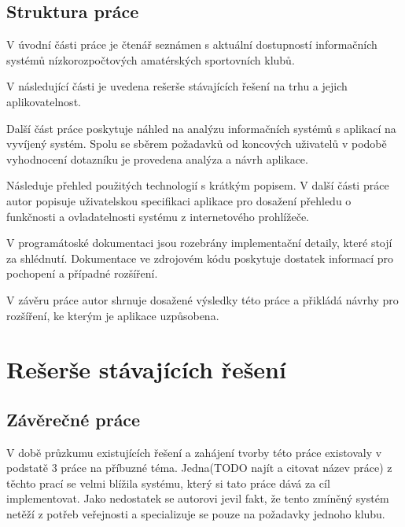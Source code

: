 \documentclass[11pt,oneside]{fithesis}
\begin{document}
        \section{Struktura práce}

        V úvodní části práce je čtenář seznámen s aktuální dostupností informačních systémů nízkorozpočtových amatérských sportovních klubů. 

        V následující části je uvedena rešerše stávajících řešení na trhu a jejich aplikovatelnost. 

        Další část práce poskytuje náhled na analýzu informačních systémů s aplikací na vyvíjený systém. Spolu se sběrem požadavků od koncových uživatelů v podobě vyhodnocení dotazníku je provedena analýza a návrh aplikace.

        Následuje přehled použitých technologií s krátkým popisem. V další části práce autor popisuje uživatelskou specifikaci aplikace pro dosažení přehledu o funkčnosti a ovladatelnosti systému z internetového prohlížeče.

        V programátoské dokumentaci jsou rozebrány implementační detaily, které stojí za shlédnutí. Dokumentace ve zdrojovém kódu poskytuje dostatek informací pro pochopení a případné rozšíření.

        V závěru práce autor shrnuje dosažené výsledky této práce a přikládá návrhy pro rozšíření, ke kterým je aplikace uzpůsobena.















\chapter{Rešerše stávajících řešení}
\section{Závěrečné práce}

V době průzkumu existujících řešení a zahájení tvorby této práce existovaly v podstatě 3 práce na příbuzné téma. Jedna(TODO najít a citovat název práce) z těchto prací se velmi blížila systému, který si tato práce dává za cíl implementovat. Jako nedostatek se autorovi jevil fakt, že tento zmíněný systém netěží z potřeb veřejnosti a specializuje se pouze na požadavky jednoho klubu.
\end{document}

